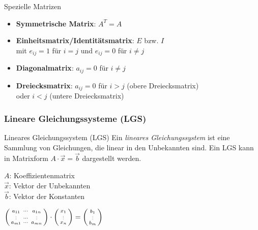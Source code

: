     \begin{KR}{Spezielle Matrizen}
        \begin{itemize}
            \item \textbf{Symmetrische Matrix}: $A^T = A$
            \item \textbf{Einheitsmatrix/Identitätsmatrix}: $E$ bzw. $I$\\ mit $e_{ij} = 1$ für $i = j$ und $e_{ij} = 0$ für $i \neq j$
            \item \textbf{Diagonalmatrix}: $a_{ij} = 0$ für $i \neq j$
            \item \textbf{Dreiecksmatrix}: $a_{ij} = 0$ für $i > j$ (obere Dreiecksmatrix) \\oder $i < j$ (untere Dreiecksmatrix)
        \end{itemize}
    \end{KR}

\raggedcolumns

\subsubsection*{Lineare Gleichungssysteme (LGS)}
    
        \begin{definition}{Lineares Gleichungssystem (LGS)}
            Ein \textit{lineares Gleichungssystem} ist eine Sammlung von Gleichungen, 
            die linear in den Unbekannten sind. 
            Ein LGS kann in Matrixform $A\cdot\vec{x}=\vec{b}$ dargestellt werden.\\
            \begin{minipage}
                {0.45\linewidth}
                {\small
                $A$: Koeffizientenmatrix\\
                $\vec{x}$: Vektor der Unbekannten\\
                $\vec{b}$: Vektor der Konstanten}
            \end{minipage}
            \begin{minipage}{0.55\linewidth}
                $\begin{psmallmatrix} a_{11} & \cdots & a_{1n} \\ \scalebox{0.5}{\vdots} & \cdots & \scalebox{0.5}{\vdots} \\ a_{m1} & \cdots & a_{mn} \end{psmallmatrix} \cdot \begin{psmallmatrix}
                    x_1 \\ \scalebox{0.5}{\vdots} \\ x_n
                \end{psmallmatrix} = \begin{psmallmatrix}
                    b_1 \\ \scalebox{0.5}{\vdots} \\ b_m
                \end{psmallmatrix}$
            \end{minipage}
        \end{definition}

